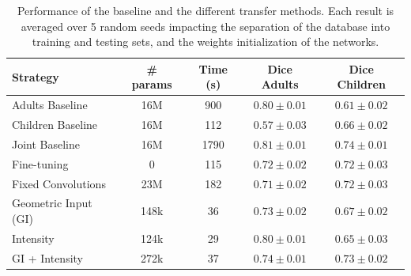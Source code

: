 \begin{table}[htb]
	\centering
\begin{tabular}{|l|c|c|c|c|}
	\hline
    Strategy & \# params & Time (s) & Dice Adults & Dice Children \\
	\hline
    Adults Baseline & 16M & 900 & $\bm{0.80 \pm 0.01}$ & $0.61 \pm 0.02$ \\
    Children Baseline & 16M & 112 & $0.57 \pm 0.03$ & $\bm{0.66 \pm 0.02}$ \\
    Joint Baseline & 16M & 1790 & $\bm{0.81 \pm 0.01}$ & $\bm{0.74 \pm 0.01}$ \\
    \hline
    Fine-tuning & 0 & 115 & $0.72 \pm 0.02$ & $0.72 \pm 0.03$ \\
    Fixed Convolutions & 23M & 182 & $0.71 \pm 0.02$ & $0.72 \pm 0.03$ \\
    Geometric Input (GI) & 148k & 36 & $0.73 \pm 0.02$ & $0.67 \pm 0.02$ \\
    Intensity & 124k & 29 & $0.80 \pm 0.01$ & $0.65 \pm 0.03$ \\
    GI + Intensity & 272k & 37 & $\bm{0.74 \pm 0.01}$ & $\bm{0.73 \pm 0.02}$ \\
    \hline
\end{tabular}
	\vspace{2mm}
	\caption[Performance of the baseline and the different transfer methods]{Performance of the baseline and the different transfer methods. Each result is averaged over 5 random seeds impacting the separation of the database into training and testing sets, and the weights initialization of the networks.}
    \label{table:results}
\end{table}


